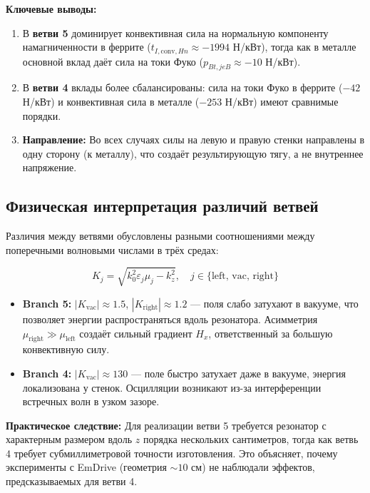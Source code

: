 \documentclass[a4paper,12pt]{article}
\begin{document}
\textbf{Ключевые выводы:}

\begin{enumerate}
    \item В \textbf{ветви 5} доминирует конвективная сила на нормальную компоненту намагниченности в феррите ($t_{I,\text{conv},Hn} \approx -1994$ Н/кВт), тогда как в металле основной вклад даёт сила на токи Фуко ($p_{Bt,jeB} \approx -10$ Н/кВт).

    \item В \textbf{ветви 4} вклады более сбалансированы: сила на токи Фуко в феррите ($-42$ Н/кВт) и конвективная сила в металле ($-253$ Н/кВт) имеют сравнимые порядки.

    \item \textbf{Направление:} Во всех случаях силы на левую и правую стенки направлены в одну сторону (к металлу), что создаёт результирующую тягу, а не внутреннее напряжение.
\end{enumerate}

\subsection{Физическая интерпретация различий ветвей}

Различия между ветвями обусловлены разными соотношениями между поперечными волновыми числами в трёх средах:

\begin{equation}
K_j = \sqrt{k_0^2 \varepsilon_j \mu_j - k_z^2}, \quad j \in \{\text{left, vac, right}\}
\end{equation}

\begin{itemize}
    \item \textbf{Branch 5:} $|K_{\text{vac}}| \approx 1.5$, $|K_{\text{right}}| \approx 1.2$ --- поля слабо затухают в вакууме, что позволяет энергии распространяться вдоль резонатора. Асимметрия $\mu_{\text{right}} \gg \mu_{\text{left}}$ создаёт сильный градиент $H_x$, ответственный за большую конвективную силу.

    \item \textbf{Branch 4:} $|K_{\text{vac}}| \approx 130$ --- поле быстро затухает даже в вакууме, энергия локализована у стенок. Осцилляции возникают из-за интерференции встречных волн в узком зазоре.
\end{itemize}

\textbf{Практическое следствие:} Для реализации ветви 5 требуется резонатор с характерным размером вдоль $z$ порядка нескольких сантиметров, тогда как ветвь 4 требует субмиллиметровой точности изготовления. Это объясняет, почему эксперименты с EmDrive (геометрия $\sim 10$ см) не наблюдали эффектов, предсказываемых для ветви 4.
\end{document}
